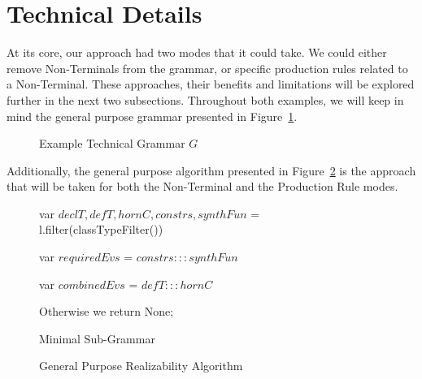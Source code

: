 \documentclass[acmsmall, nonacm]{acmart}
\begin{document}
\section{Technical Details}

At its core, our approach had two modes that it could take.
We could either remove Non-Terminals from the grammar, or
specific production rules related to a Non-Terminal.
These approaches, their benefits and limitations will
be explored further in the next two subsections.
Throughout both examples, we will keep in mind the general purpose grammar
presented in Figure~\ref{fig:Technical-Grammar}.


\begin{figure}[H]
  \centering
  \caption{Example Technical Grammar $G$}
  \label{fig:Technical-Grammar}
\end{figure}

Additionally, the general purpose algorithm presented in Figure~\ref{fig:Algorithm} is the approach that will be taken for both
the Non-Terminal and the Production Rule modes.

\begin{figure}[H]
  \begin{algorithm}[H]
    \SetAlgoLined

    var $declT, defT, hornC, constrs, synthFun$ = l.filter(classTypeFilter())

    var $requiredEvs$ = $constrs ::: synthFun$

    var $combinedEvs$ = $defT ::: hornC$

    \BlankLine
    Otherwise we return None;

    \caption{Minimal Sub-Grammar}
  \end{algorithm}
  \caption{General Purpose Realizability Algorithm}
  \label{fig:Algorithm}
\end{figure}
\end{document}
